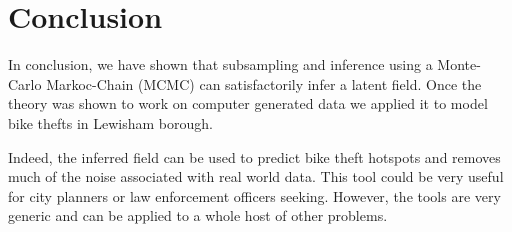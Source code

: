 \documentclass[]{article}
\begin{document}
\section{Conclusion}

In conclusion, we have shown that subsampling and inference using a Monte-Carlo Markoc-Chain (MCMC) can satisfactorily infer a latent field. Once the theory was shown to work on computer generated data we applied it to model bike thefts in Lewisham borough.

Indeed, the inferred field can be used to predict bike theft hotspots and removes much of the noise associated with real world data. This tool could be very useful for city planners or law enforcement officers seeking. However, the tools are very generic and can be applied to a whole host of other problems.
\end{document}
